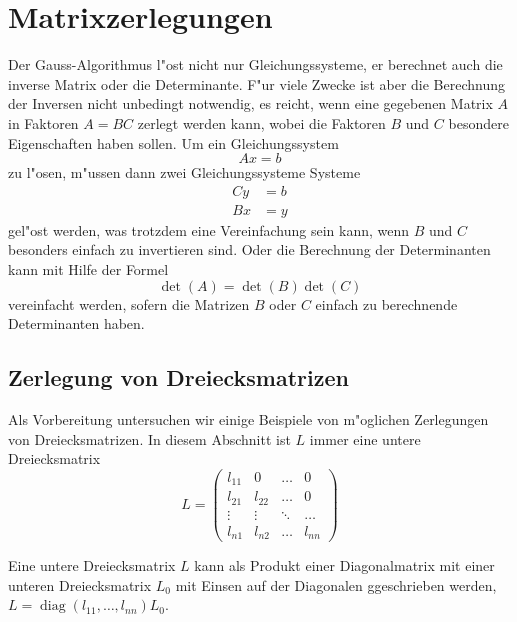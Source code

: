 %
%
%
\chapter{Matrixzerlegungen\label{chapter-zerlegung}}
Der Gauss-Algorithmus l"ost nicht nur Gleichungssysteme, er berechnet
auch die inverse Matrix oder die Determinante. F"ur viele Zwecke ist
aber die Berechnung der Inversen nicht unbedingt notwendig, es reicht,
wenn eine gegebenen Matrix $A$ in Faktoren $A=BC$ zerlegt werden kann,
wobei die Faktoren $B$ und $C$ besondere Eigenschaften haben sollen.
Um ein Gleichungssystem
\[
Ax=b
\]
zu l"osen, m"ussen dann zwei Gleichungssysteme Systeme
\begin{align*}
Cy&=b\\
Bx&=y
\end{align*}
gel"ost werden, was trotzdem eine Vereinfachung sein kann, wenn
$B$ und $C$ besonders einfach zu invertieren sind.
Oder die Berechnung der Determinanten kann mit Hilfe der Formel
\[
\det(A)=\det(B)\det(C)
\]
vereinfacht werden, sofern die Matrizen $B$ oder $C$ einfach
zu berechnende Determinanten haben.

\section{Zerlegung von Dreiecksmatrizen}
Als Vorbereitung untersuchen wir einige Beispiele von m"oglichen
Zerlegungen von Dreiecksmatrizen. In diesem Abschnitt ist $L$ immer
eine untere Dreiecksmatrix
\[
L=\begin{pmatrix}
l_{11}&0     &\dots &0     \\
l_{21}&l_{22}&\dots &0     \\
\vdots&\vdots&\ddots&\dots \\
l_{n1}&l_{n2}&\dots &l_{nn}
\end{pmatrix}
\]
\begin{hilfssatz}
Eine untere Dreiecksmatrix $L$ kann als Produkt einer Diagonalmatrix
mit einer unteren Dreiecksmatrix $L_0$ mit Einsen auf der Diagonalen
ggeschrieben werden, $L=\operatorname{diag}(l_{11},\dots,l_{nn}) L_0$.
\end{hilfssatz}

